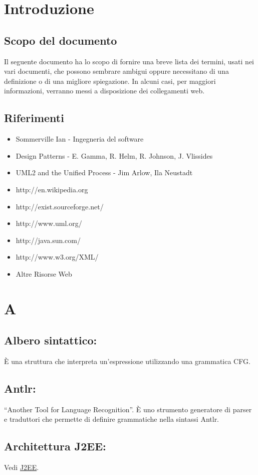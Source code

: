 \chapter{Introduzione}
\section{Scopo del documento}
Il seguente documento ha lo scopo di fornire una breve lista dei termini, usati nei vari documenti, che possono sembrare ambigui oppure necessitano di una definizione o di una migliore spiegazione. In alcuni casi, per maggiori informazioni, verranno messi a disposizione dei collegamenti web.
\section{Riferimenti}
\begin{itemize}
\item Sommerville Ian - Ingegneria del software
\item Design Patterns - E. Gamma, R. Helm, R. Johnson, J. Vlissides
\item UML2 and the Unified Process - Jim Arlow, Ila Neustadt
\item http://en.wikipedia.org
\item http://exist.sourceforge.net/
\item http://www.uml.org/
\item http://java.sun.com/
\item http://www.w3.org/XML/
\item Altre Risorse Web


\end{itemize}
\chapter{A}
\section{Albero sintattico:}
\`E una struttura che interpreta un'espressione utilizzando una grammatica CFG.
\section{Antlr:}
``Another Tool for Language Recognition''. \`E uno strumento generatore di parser e traduttori che permette di definire grammatiche nella sintassi Antlr.
\section{Architettura J2EE:}
Vedi \hyperlink{J2EE}{J2EE}.
